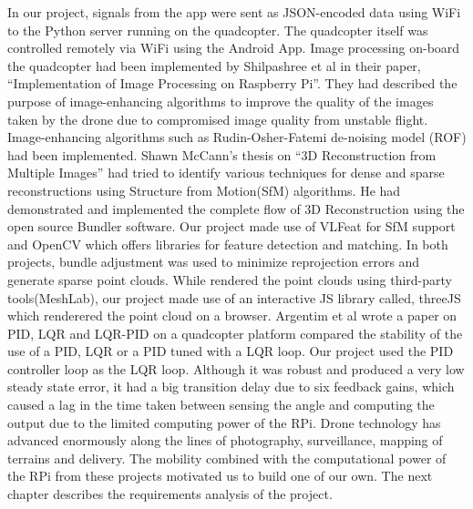 \newline \newline
 In our project, signals from the app were sent as JSON-encoded data using WiFi to the Python server running on the quadcopter. The quadcopter itself was controlled remotely via WiFi using the Android App.
\newline \newline
Image processing on-board the quadcopter had been implemented by Shilpashree et al \cite{ijarcce-disc-2015} in their paper, “Implementation of Image Processing on Raspberry Pi”. They had described the purpose of  image-enhancing algorithms to improve the quality of the images taken by the drone due to compromised image quality from unstable flight. Image-enhancing algorithms such as Rudin-Osher-Fatemi de-noising model (ROF) had been implemented. 
\newline \newline
Shawn McCann's thesis on “3D Reconstruction from Multiple Images” \cite{stan-disc-2015} had tried to identify various techniques for dense and sparse reconstructions using Structure from Motion(SfM) algorithms. He had demonstrated and implemented the complete flow of 3D Reconstruction using the open source Bundler software. Our project made use of VLFeat for SfM support and OpenCV which offers libraries for feature detection and matching. In both projects, bundle adjustment was used to minimize reprojection errors and generate sparse point clouds. While \cite{stan-disc-2015} rendered the point clouds using third-party tools(MeshLab), our project made use of an interactive JS library called, threeJS which renderered the point cloud on a browser.
\newline \newline
Argentim et al wrote a paper on PID, LQR and LQR-PID on a quadcopter platform \cite{argentim2013pid} compared the stability of the use of a PID, LQR or a PID tuned with a LQR loop. Our project used the PID controller loop as the LQR loop. Although it was robust and produced a very low steady state error, it had a big transition delay due to six feedback gains, which caused a lag in the time taken between sensing the angle and computing the output due to the limited computing power of the RPi.
\newline \newline
Drone technology has advanced enormously along the lines of photography, surveillance, mapping of terrains and delivery. The mobility combined with the computational power of the RPi from these projects motivated us to build one of our own.
\newline \newline
The next chapter describes the requirements analysis of the project.
